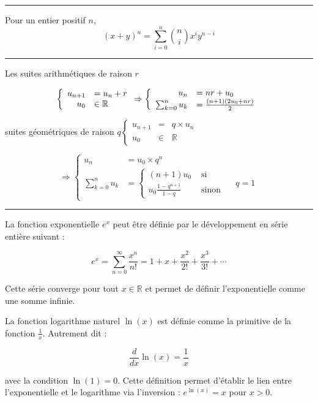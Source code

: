 \hrule
\begin{f}
	
	Pour un entier positif $n$,
	$$
	(x+y)^n=\sum_{i=0}^n\binom{n}{i} x^i y^{n-i}
	$$
	
\end{f}
\hrule
\begin{f}[Suites]  
	
	Les suites arithmétiques de raison $r$
	
	$$
	\left\{\begin{array} { r l } 
		{ u _ { n + 1 } } & { = u _ { n } + r } \\
		{ u _ { 0 } } & { \in \mathbb { R } }
	\end{array} \Rightarrow \left\{\begin{array}{rl}
		u_n & =n r+u_0 \\
		\sum_{k=0}^n u_k & =\frac{(n+1)\left(2 u_0+n r\right)}{2}
	\end{array}\right.\right.
	$$
	
	suites géométriques de raison $q\left\{\begin{array}{rll}u_{n+1} & = & q \times u_n \\ u_0 & \in & \mathbb{R}\end{array}\right.$
	
	$$
	\Rightarrow\left\{\begin{array}{rlr}
		u_n & =u_0 \times q^n \\
		\sum_{k=0}^n u_k & =\left\{\begin{array}{rl}
			(n+1) u_0 & \text { si } \\
			u_0 \frac{1-q^{n+1}}{1-q} & \text { sinon }
		\end{array} \quad q=1\right.
	\end{array}\right.
	$$
	
\end{f}
\hrule
\begin{f}
	La fonction exponentielle \( e^x \) peut être définie par le développement en série entière suivant :
	
	\[
	e^x = \sum_{n=0}^{\infty} \frac{x^n}{n!} = 1 + x + \frac{x^2}{2!} + \frac{x^3}{3!} + \cdots
	\]
	
	Cette série converge pour tout \( x \in \mathbb{R} \) et permet de définir l'exponentielle comme une somme infinie.
	
	
	La fonction logarithme naturel \( \ln(x) \) est définie comme la primitive de la fonction \( \frac{1}{x} \). Autrement dit :
	
	\[
	\frac{d}{dx} \ln(x) = \frac{1}{x}
	\]
	
	avec la condition \( \ln(1) = 0 \). Cette définition permet d'établir le lien entre l'exponentielle et le logarithme via l'inversion : \( e^{\ln(x)} = x \) pour \( x > 0 \).
	
\end{f}



